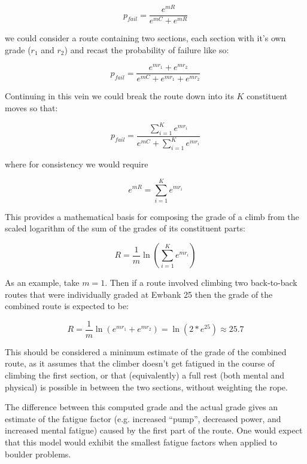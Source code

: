 \documentclass[11pt]{article}
\begin{document}
\begin{equation}
p_{fail} = \frac{e^{mR}}{e^{mC} + e^{mR}}
\end{equation} 

we could consider a route containing two sections, each section with it's own grade ($r_1$ and $r_2$) and recast the probability of failure like so:

\begin{equation}
p_{fail} = \frac{e^{mr_1} + e^{mr_2}}{e^{mC} + e^{mr_1} + e^{mr_2}}
\end{equation} 

Continuing in this vein we could break the route down into its $K$ constituent moves so that:

\begin{equation}
p_{fail} = \frac{\sum_{i=1}^{K}e^{mr_i}}{e^{mC} + \sum_{i=1}^{K}e^{mr_i}}
\label{compose}
\end{equation} 

where for consistency we would require

\begin{equation}
e^{mR} = \sum_{i=1}^{K}e^{mr_i}
\end{equation} 

This provides a mathematical basis for composing the grade of a climb from the scaled logarithm of the sum of the grades of its constituent parts:

\begin{equation}
R = \frac{1}{m} \ln \left(\sum_{i=1}^{K}e^{mr_i}\right)
\end{equation} 

As an example, take $m=1$. Then if a route involved climbing two back-to-back routes that were individually graded at Ewbank 25 then the grade of the combined route is expected to be:

\begin{equation}
R = \frac{1}{m} \ln \left(e^{mr_1} + e^{mr_2}\right) = \ln \left(2 * e^{25}\right) \approx 25.7
\end{equation} 

This should be considered a minimum estimate of the grade of the combined route, as it assumes that the climber doesn't get fatigued in the course of climbing the first section, or that (equivalently) a full rest (both mental and physical) is possible in between the two sections, without weighting the rope.

The difference between this computed grade and the actual grade gives an estimate of the fatigue factor (e.g. increased ``pump'', decreased power, and increased mental fatigue) caused by the first part of the route. One would expect that this model would exhibit the smallest fatigue factors when applied to boulder problems. 
\end{document}
